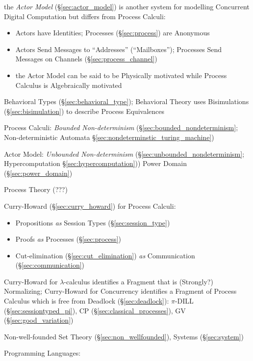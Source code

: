 \fist the \emph{Actor Model} (\S\ref{sec:actor_model}) is
another system for modelling Concurrent Digital Computation but
differs from Process Calculi:
\begin{itemize}
  \item Actors have Identities; Processes (\S\ref{sec:process}) are
    Anonymous
  \item Actors Send Messages to ``Addresses'' (``Mailboxes'');
    Processes Send Messages on Channels (\S\ref{sec:process_channel})
  \item the Actor Model can be said to be Physically motivated while
    Process Calculus is Algebraically motivated
\end{itemize}

\fist Behavioral Types (\S\ref{sec:behavioral_type}); Behavioral
Theory uses Bisimulations (\S\ref{sec:bisimulation}) to describe
Process Equivalences


Process Calculi: \emph{Bounded Non-determinism}
(\S\ref{sec:bounded_nondeterminism}; \fist Non-deterministic Automata
\S\ref{sec:nondeterminstic_turing_machine})

Actor Model: \emph{Unbounded Non-determinism}
(\S\ref{sec:unbounded_nondeterminism}; \fist Hypercomputation
\S\ref{sec:hypercomputation})) Power Domain (\S\ref{sec:power_domain})

Process Theory (???)

Curry-Howard (\S\ref{sec:curry_howard}) for Process Calculi:
\begin{itemize}
  \item Propositions \emph{as} Session Types (\S\ref{sec:session_type})
  \item Proofs \emph{as} Processes (\S\ref{sec:process})
  \item Cut-elimination (\S\ref{sec:cut_elimination}) \emph{as}
    Communication (\S\ref{sec:communication})
\end{itemize}

Curry-Howard for $\lambda$-calculus identifies a Fragment that is
(Strongly?) Normalizing; Curry-Howard for Concurrency identifies a
Fragment of Process Calculus which is free from Deadlock
(\S\ref{sec:deadlock}): $\pi$-DILL
(\S\ref{sec:sessiontyped_pi}), CP
(\S\ref{sec:classical_processes}), GV (\S\ref{sec:good_variation})

Non-well-founded Set Theory (\S\ref{sec:non_wellfounded}), Systems
(\S\ref{sec:system})


\asterism

Programming Languages:

